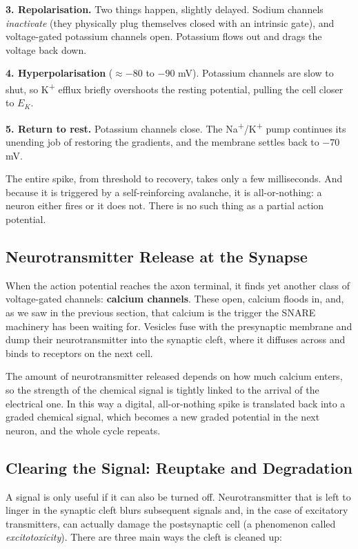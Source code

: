 \documentclass[11pt]{article}
\begin{document}
\textbf{3. Repolarisation.} Two things happen, slightly delayed. Sodium channels \textit{inactivate} (they physically plug themselves closed with an intrinsic gate), and voltage-gated potassium channels open. Potassium flows out and drags the voltage back down.

\textbf{4. Hyperpolarisation} ($\approx -80$ to $-90$ mV). Potassium channels are slow to shut, so K\textsuperscript{+} efflux briefly overshoots the resting potential, pulling the cell closer to $E_K$.

\textbf{5. Return to rest.} Potassium channels close. The Na\textsuperscript{+}/K\textsuperscript{+} pump continues its unending job of restoring the gradients, and the membrane settles back to $-70$ mV.

The entire spike, from threshold to recovery, takes only a few milliseconds. And because it is triggered by a self-reinforcing avalanche, it is all-or-nothing: a neuron either fires or it does not. There is no such thing as a partial action potential.

\subsection{Neurotransmitter Release at the Synapse}

When the action potential reaches the axon terminal, it finds yet another class of voltage-gated channels: \textbf{calcium channels}. These open, calcium floods in, and, as we saw in the previous section, that calcium is the trigger the SNARE machinery has been waiting for. Vesicles fuse with the presynaptic membrane and dump their neurotransmitter into the synaptic cleft, where it diffuses across and binds to receptors on the next cell.

The amount of neurotransmitter released depends on how much calcium enters, so the strength of the chemical signal is tightly linked to the arrival of the electrical one. In this way a digital, all-or-nothing spike is translated back into a graded chemical signal, which becomes a new graded potential in the next neuron, and the whole cycle repeats.

\subsection{Clearing the Signal: Reuptake and Degradation}

A signal is only useful if it can also be turned off. Neurotransmitter that is left to linger in the synaptic cleft blurs subsequent signals and, in the case of excitatory transmitters, can actually damage the postsynaptic cell (a phenomenon called \textit{excitotoxicity}). There are three main ways the cleft is cleaned up:
\end{document}
